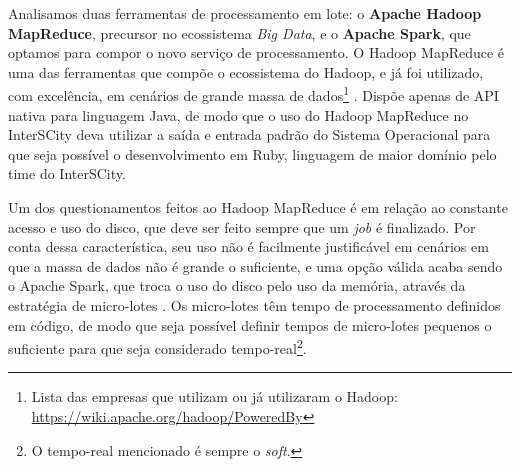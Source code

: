 Analisamos duas ferramentas de processamento em lote: o \textbf{Apache
Hadoop MapReduce}, precursor no ecossistema \textit{Big Data}, e o
\textbf{Apache Spark}, que optamos para compor o novo serviço de processamento.
O Hadoop MapReduce é uma das ferramentas que compõe o ecossistema do Hadoop, e
já foi utilizado, com excelência, em cenários de grande massa de
dados\footnote{Lista das empresas que utilizam ou já utilizaram o Hadoop:
\url{https://wiki.apache.org/hadoop/PoweredBy}} \cite{zaharia2008}.
Dispõe apenas de API nativa para linguagem Java, de modo que o uso do Hadoop
MapReduce no InterSCity deva utilizar a saída e entrada padrão do
Sistema Operacional para que seja possível o desenvolvimento em Ruby, linguagem
de maior domínio pelo time do InterSCity.

Um dos questionamentos feitos ao Hadoop MapReduce é em relação ao constante acesso e
uso do disco, que deve ser feito sempre que um \textit{job} é finalizado. Por
conta dessa característica, seu uso não é facilmente justificável em cenários em
que a massa de dados não é grande o suficiente, e uma opção válida acaba sendo
o Apache Spark, que troca o uso do disco pelo uso da memória, através da estratégia
de micro-lotes \cite{arsalan2014}. Os micro-lotes têm tempo de processamento
definidos em código, de modo que seja possível definir tempos de
micro-lotes pequenos o suficiente para que seja considerado
tempo-real\footnote{O tempo-real mencionado é sempre o \textit{soft}.}.

